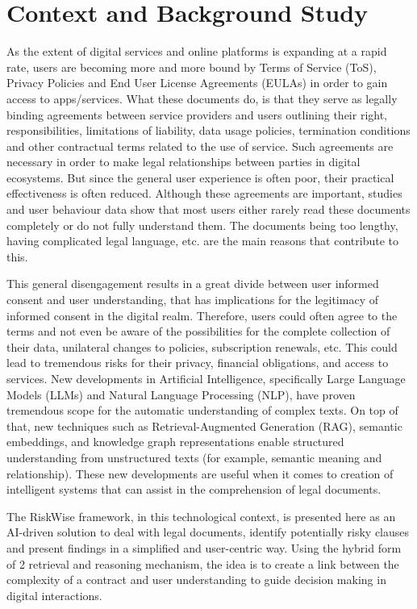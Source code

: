 \section{Context and Background Study}
As the extent of digital services and online 
platforms is expanding at a rapid rate, users are 
becoming more and more bound by Terms of Service (ToS), 
Privacy Policies and End User License Agreements (EULAs) 
in order to gain access to apps/services. 
What these documents do, is that they serve as legally binding 
agreements between service providers and users 
outlining their right, responsibilities, limitations of 
liability, data usage policies, termination conditions and 
other contractual terms related to the use of service.  
Such agreements are necessary in order to make legal relationships 
between parties in digital ecosystems. But since the general user 
experience is often poor, their practical effectiveness is often reduced. 
Although these agreements are important, studies and user behaviour data 
show that most users either rarely read these documents 
completely or do not fully understand them.
The documents being too lengthy, 
having complicated legal language, etc. are the 
main reasons that contribute to this.

This general disengagement results in a great divide between user
informed consent and user understanding, that has implications for
the legitimacy of informed consent in the digital realm. 
Therefore, users could often agree to the terms and not even be 
aware of the possibilities for the complete collection of their 
data, unilateral changes to policies, subscription renewals, etc. 
This could lead to tremendous risks for their privacy, financial obligations, 
and access to services. 
New developments in Artificial Intelligence, specifically Large Language Models (LLMs) and
Natural Language Processing (NLP), have proven tremendous scope for the 
automatic understanding of complex texts. On top of that, new techniques 
such as Retrieval-Augmented Generation (RAG), semantic embeddings, and
knowledge graph representations enable structured understanding from 
unstructured texts (for example, semantic meaning and relationship). 
These new developments are useful when it comes to creation of 
intelligent systems that can assist in the comprehension of legal documents.

The RiskWise framework, in this technological context, is presented here as an 
AI-driven solution to deal with legal documents, identify potentially 
risky clauses and present findings in a simplified and user-centric way. 
Using the hybrid form of 2 retrieval and reasoning mechanism, the idea is 
to create a link between the complexity of a contract and user 
understanding to guide decision making in digital interactions.


